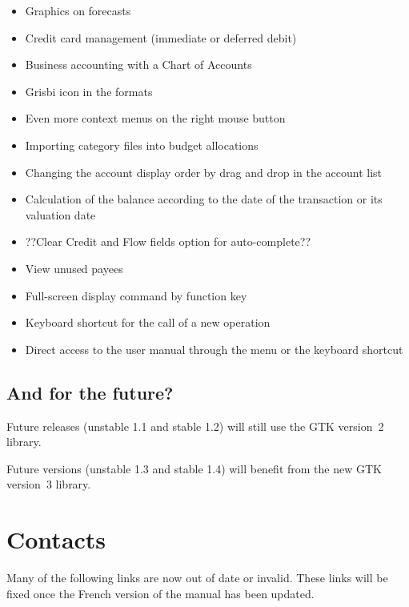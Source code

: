 \begin{itemize}

\item Graphics on forecasts

\item Credit card management (immediate or deferred debit)

\item Business accounting with a Chart of Accounts

\item Grisbi icon in the   formats 

\item Even more context menus on the right mouse button

\item Importing category files into budget allocations

\item Changing the account display order by drag and drop in the account list

\item Calculation of the balance according to the date of the transaction or its valuation date

\item ??Clear Credit and Flow fields option for auto-complete??

\item View unused payees

\item Full-screen display command by function key 

\item Keyboard shortcut   for the call of a new operation

\item Direct access to the user manual through the menu  or the keyboard shortcut  

\end{itemize}

\subsection{And for the future?}

Future releases (unstable 1.1 and stable 1.2) will still use the \gls{GTK} version~2 library.

Future versions (unstable 1.3 and stable 1.4) will benefit from the new GTK version~3 library.

\section{Contacts\label{introduction-contact}}
 Many of the following links are now out of date or invalid.  These links will be fixed once the French version of the manual has been updated.

